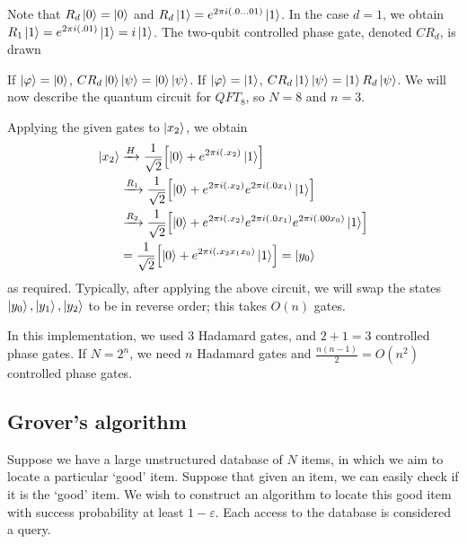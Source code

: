 Note that \( R_d \ket{0} = \ket{0} \) and \( R_d \ket{1} = e^{2\pi i(.0\dots 01)} \ket{1} \).
In the case \( d = 1 \), we obtain \( R_1 \ket{1} = e^{2 \pi i(.01)} \ket{1} = i \ket{1} \).
The two-qubit controlled phase gate, denoted \( CR_d \), is drawn
\begin{center}
    \leavevmode
\end{center}
If \( \ket{\varphi} = \ket{0} \), \( CR_d\ket{0}\ket{\psi} = \ket{0}\ket{\psi} \).
If \( \ket{\varphi} = \ket{1} \), \( CR_d\ket{1}\ket{\psi} = \ket{1}R_d\ket{\psi} \).
We will now describe the quantum circuit for \( QFT_8 \), so \( N = 8 \) and \( n = 3 \).
\begin{center}
    \leavevmode
\end{center}
Applying the given gates to \( \ket{x_2} \), we obtain
\begin{align*}
    \ket{x_2} &\xrightarrow{H} \frac{1}{\sqrt{2}}\qty[\ket{0} + e^{2\pi i (.x_2)} \ket{1}] \\
    &\xrightarrow{R_1} \frac{1}{\sqrt{2}}\qty[\ket{0} + e^{2\pi i (.x_2)} e^{2\pi i(.0x_1)} \ket{1}] \\
    &\xrightarrow{R_2} \frac{1}{\sqrt{2}}\qty[\ket{0} + e^{2\pi i(.x_2)} e^{2\pi i(.0x_1)} e^{2\pi i(.00x_0)} \ket{1}] \\
    &= \frac{1}{\sqrt{2}}\qty[\ket{0} + e^{2\pi i(.x_2 x_1 x_0)} \ket{1}] = \ket{y_0}
\end{align*}
as required.
Typically, after applying the above circuit, we will swap the states \( \ket{y_0}, \ket{y_1}, \ket{y_2} \) to be in reverse order; this takes \( O(n) \) gates.

In this implementation, we used 3 Hadamard gates, and \( 2 + 1 = 3 \) controlled phase gates.
If \( N = 2^n \), we need \( n \) Hadamard gates and \( \frac{n(n-1)}{2} = O(n^2) \) controlled phase gates.

\subsection{Grover's algorithm}
Suppose we have a large unstructured database of \( N \) items, in which we aim to locate a particular `good' item.
Suppose that given an item, we can easily check if it is the `good' item.
We wish to construct an algorithm to locate this good item with success probability at least \( 1 - \varepsilon \).
Each access to the database is considered a query.

